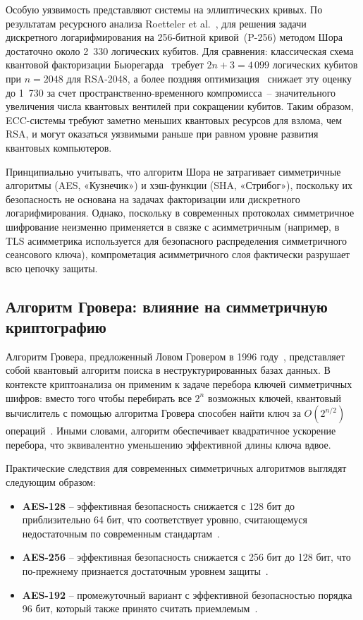 \documentclass{itmo-vkr}
\begin{document}
	Особую уязвимость представляют системы на эллиптических кривых. По результатам ресурсного анализа Roetteler et al.~\cite{roetteler2017ecc}, для решения задачи дискретного логарифмирования на 256-битной кривой~(P-256) методом Шора достаточно около 2~330 логических кубитов. Для сравнения: классическая схема квантовой факторизации Бьюрегарда~\cite{beauregard2003circuit} требует $2n{+}3 = 4\,099$ логических кубитов при $n = 2048$ для RSA-2048, а более поздняя оптимизация~\cite{chevignard2024reducing} снижает эту оценку до 1~730 за счет пространственно-временного компромисса~-- значительного увеличения числа квантовых вентилей при сокращении кубитов. Таким образом, ECC-системы требуют заметно меньших квантовых ресурсов для взлома, чем RSA, и могут оказаться уязвимыми раньше при равном уровне развития квантовых компьютеров.
	
	Принципиально учитывать, что алгоритм Шора не затрагивает симметричные алгоритмы (AES, «Кузнечик») и хэш-функции (SHA, «Стрибог»), поскольку их безопасность не основана на задачах факторизации или дискретного логарифмирования. Однако, поскольку в современных протоколах симметричное шифрование неизменно применяется в связке с асимметричным (например, в TLS асимметрика используется для безопасного распределения симметричного сеансового ключа), компрометация асимметричного слоя фактически разрушает всю цепочку защиты.
	
	
	\subsection{Алгоритм Гровера: влияние на симметричную криптографию}
	
	Алгоритм Гровера, предложенный Ловом Гровером в 1996 году~\cite{grover1996fast}, представляет собой квантовый алгоритм поиска в неструктурированных базах данных. В контексте криптоанализа он применим к задаче перебора ключей симметричных шифров: вместо того чтобы перебирать все $2^n$ возможных ключей, квантовый вычислитель с помощью алгоритма Гровера способен найти ключ за $O(2^{n/2})$ операций~\cite{grover1996fast}. Иными словами, алгоритм обеспечивает квадратичное ускорение перебора, что эквивалентно уменьшению эффективной длины ключа вдвое. 
	
	Практические следствия для современных симметричных алгоритмов выглядят следующим образом:
	
	\begin{itemize}
		\item \textbf{AES-128} -- эффективная безопасность снижается с 128 бит до приблизительно 64 бит, что соответствует уровню, считающемуся недостаточным по современным стандартам~\cite{grover1996fast,nist-ir8547}.
		\item \textbf{AES-256} -- эффективная безопасность снижается с 256 бит до 128 бит, что по-прежнему признается достаточным уровнем защиты~\cite{nist-ir8547}.
		\item \textbf{AES-192} -- промежуточный вариант с эффективной безопасностью порядка 96 бит, который также принято считать приемлемым~\cite{nist-ir8547}.
	\end{itemize}
	
\end{document}
